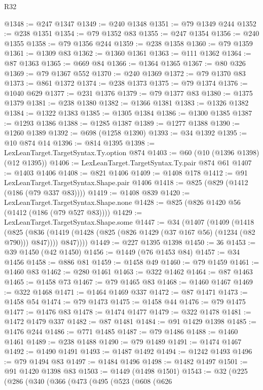 \begin{lexlean}{R32}
\begin{coremodule}
@1348 := @247 @1347
@1349 := @240 @1348
@1351 := @79 @1349 @244
@1352 := @238 @1351
@1354 := @79 @1352 @83
@1355 := @247 @1354
@1356 := @240 @1355
@1358 := @79 @1356 @244
@1359 := @238 @1358
@1360 := @79 @1359
@1361 := @1309 @83
@1362 := @1360 @1361
@1363 := @111 @1362
@1364 := @87 @1363
@1365 := @669 @84
@1366 := @1364 @1365
@1367 := @80 @326
@1369 := @79 @1367 @552
@1370 := @240 @1369
@1372 := @79 @1370 @83
@1373 := @861 @1372
@1374 := @238 @1373
@1375 := @79 @1374
@1376 := @1040 @629
@1377 := @231 @1376
@1379 := @79 @1377 @83
@1380 := @1375 @1379
@1381 := @238 @1380
@1382 := @1366 @1381
@1383 := @1326 @1382
@1384 := @1322 @1383
@1385 := @1305 @1384
@1386 := @1300 @1385
@1387 := @1293 @1386
@1388 := @1285 @1387
@1389 := @1277 @1388
@1390 := @1260 @1389
@1392 := @698 (@1258 @1390)
@1393 := @34 @1392
@1395 := @10 @874 @14
@1396 := @814 @1395
@1398 := LexLeanTarget.TargetSyntax.Ty.option @874
@1403 := @60 (@10 (@1396 @1398) (@12 @1395))
@1406 := LexLeanTarget.TargetSyntax.Ty.pair @874 @61
@1407 := @1403 @1406
@1408 := @821 @1406
@1409 := @1408 @178
@1412 := @91 LexLeanTarget.TargetSyntax.Shape.pair @1406
@1418 := @825 (@829 (@1412 (@186 (@79 @337 @83))))
@1419 := @1408 @839
@1420 := LexLeanTarget.TargetSyntax.Shape.none
@1428 := @825 (@826 @1420 @56 (@1412 (@186 (@79 @527 @83))))
@1429 := LexLeanTarget.TargetSyntax.Shape.some
@1447 := @34
    (@1407
      (@1409
        (@1418
          (@825
            (@836 (@1419 (@1428 (@825 (@826 @1429 (@37 @167 @56) (@1234 (@82 @790))) @847))))
            @847))))
@1449 := @227 @1395 @1398
@1450 := 36
@1453 := @39 @1450 (@42 @1450)
@1456 := @1449 (@76 @1453 @84)
@1457 := @34 @1456
@1458 := @886 @81
@1459 := @1458 @49
@1460 := @79 @1459
@1461 := @1460 @83
@1462 := @280 @1461
@1463 := @322 @1462
@1464 := @87 @1463
@1465 := @1458 @73
@1467 := @79 @1465 @83
@1468 := @1460 @1467
@1469 := @322 @1468
@1471 := @1464 @1469 @337
@1472 := @87 @1471
@1473 := @1458 @54
@1474 := @79 @1473
@1475 := @1458 @44
@1476 := @79 @1475
@1477 := @1476 @83
@1478 := @1474 @1477
@1479 := @322 @1478
@1481 := @1472 @1479 @337
@1482 := @87 @1481
@1484 := @91 @1429 @1398
@1485 := @1476 @244
@1486 := @771 @1485
@1487 := @79 @1486
@1488 := @1460 @1461
@1489 := @238 @1488
@1490 := @79 @1489
@1491 := @1474 @1467
@1492 := @1490 @1491
@1493 := @1487 @1492
@1494 := @1242 @1493
@1496 := @79 @1494 @83
@1497 := @1484 @1496
@1498 := @1482 @1497
@1501 := @91 @1420 @1398 @83
@1503 := @1449 (@1498 @1501)
@1543 := @32
    (@225
      (@286
        (@340
          (@366
            (@473
              (@495
                (@523
                  (@608
                    (@626

\end{coremodule}
\end{lexlean}
